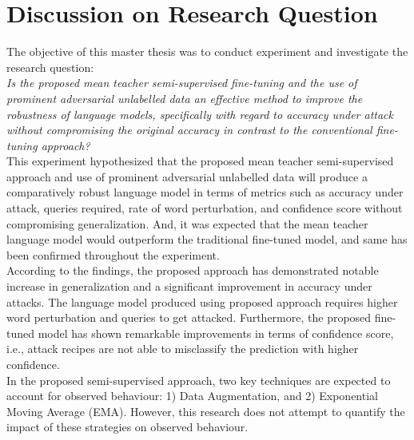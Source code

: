 \documentclass[%
	BCOR=8mm, %
	DIV=12,
	toc=bibliography, %
	toc=listof, %
	oneside, %
	egregdoesnotlikesansseriftitles, %
	]{scrbook}
\begin{document}
\section{Discussion on Research Question}
The objective of this master thesis was to conduct experiment and investigate the research question: \\

\emph{Is the proposed mean teacher semi-supervised fine-tuning and the use of prominent adversarial unlabelled data an effective method to improve the robustness of language models, specifically with regard to accuracy under attack without compromising the original accuracy in contrast to the conventional fine-tuning approach?}\\

This experiment hypothesized that the proposed mean teacher semi-supervised approach and use of prominent adversarial unlabelled data will produce a comparatively robust language model in terms of metrics such as accuracy under attack, queries required, rate of word perturbation, and confidence score without compromising generalization. And, it  was expected that the mean teacher language model would outperform the traditional fine-tuned model, and same has been confirmed throughout the experiment.\\
According to the findings, the proposed approach has demonstrated notable increase in generalization and a significant improvement in accuracy under attacks. The language model produced using proposed approach requires higher word perturbation and queries to get attacked. Furthermore, the proposed fine-tuned model has shown remarkable improvements in terms of confidence score, i.e., attack recipes are not able to misclassify the prediction with higher confidence.\\
In the proposed semi-supervised approach, two key techniques are expected to account for observed behaviour: 1) Data Augmentation, and 2) Exponential Moving Average (EMA). However, this research does not attempt to quantify the impact of these strategies on observed behaviour. 
\end{document}

